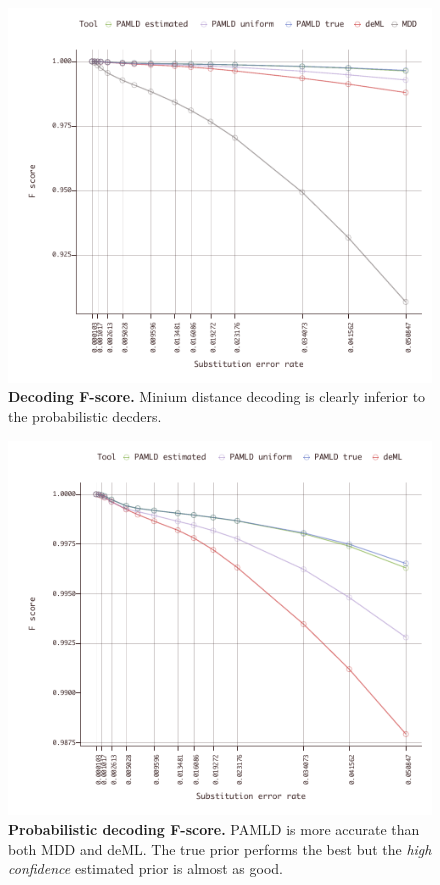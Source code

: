 \documentclass[10pt,twocolumn]{article}
\begin{document}
\begin{figure}[htbp]
\centering
\includegraphics[keepaspectratio,scale=1]{../plot/1_overall_0550_mdd}
\caption{ \footnotesize{ \textbf{Decoding F-score.} Minium distance decoding is clearly inferior to the probabilistic decders. } }
\label{fig:01}
\end{figure}

\begin{figure}[htbp]
\centering
\includegraphics[keepaspectratio,scale=1]{../plot/2_overall_0550}
\caption{\footnotesize{\textbf{Probabilistic decoding F-score.} PAMLD is more accurate than both MDD and deML. The true prior performs the best but the \emph{high confidence} estimated prior is almost as good. } }
\label{fig:02}
\end{figure}
\end{document}
